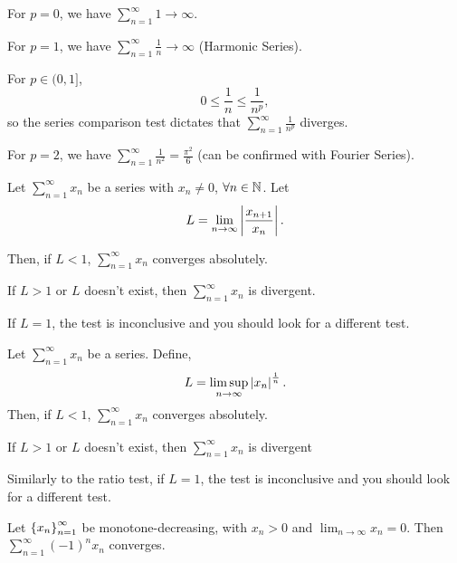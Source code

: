 \documentclass[12pt]{article}
\theoremstyle{definition}
\newcommand{\xn}{\set{x_{n}}_{n = 1}^{\infty}}
\newcommand{\xseries}{\sum_{n = 1}^{\infty}x_{n}}
\newcommand{\nlim}{\lim_{n\rightarrow\infty}}
\begin{document}
            \newpage
            
            \begin{eg}
                For $p = 0$, we have $\sum_{n = 1}^{\infty}1 \rightarrow \infty$.

                For $p = 1$, we have $\sum_{n = 1}^{\infty}\frac{1}{n} \rightarrow \infty$ (Harmonic Series).

                For $p \in (0, 1]$, 
                \begin{equation*}
                    0 \leq \frac{1}{n} \leq \frac{1}{n^{p}},
                \end{equation*}
                so the series comparison test dictates that $\sum_{n = 1}^{\infty}\frac{1}{n^{p}}$ diverges.

                For $p = 2$, we have $\sum_{n = 1}^{\infty}\frac{1}{n^{2}} = \frac{\pi^{2}}{6}$ (can be confirmed with Fourier Series). 
            \end{eg}

            \begin{prop}
                Let $\xseries$ be a series with $x_{n} \neq 0$, $\forall n \in \mathbb{N}$. Let
                \begin{equation*}
                    L = \lim_{n \rightarrow \infty}\left|\frac{x_{n + 1}}{x_{n}}\right|.
                \end{equation*}

                Then, if $L < 1$, $\xseries$ converges absolutely. 

                If $L > 1$ or $L$ doesn't exist, then $\xseries$ is divergent.
            \end{prop}
            \begin{remark}
                If $L = 1$, the test is inconclusive and you should look for a different test.
            \end{remark}
            \begin{prop}
                Let $\xseries$ be a series. Define,
                \begin{equation*}
                    L = \limsup_{n \rightarrow \infty}\left|x_{n}\right|^{\frac{1}{n}}.
                \end{equation*}
                Then, if $L < 1$, $\xseries$ converges absolutely.

                If $L > 1$ or $L$ doesn't exist, then $\xseries$ is divergent
            \end{prop}
            \begin{remark}
                Similarly to the ratio test, if $L = 1$, the test is inconclusive and you should look for a different test.
            \end{remark}
            \begin{prop}
                Let $\xn$ be monotone-decreasing, with $x_{n} > 0$ and $\nlim x_{n} = 0$. 
                Then $\sum_{n = 1}^{\infty}(-1)^{n}x_{n}$ converges.
            \end{prop}
\end{document}
